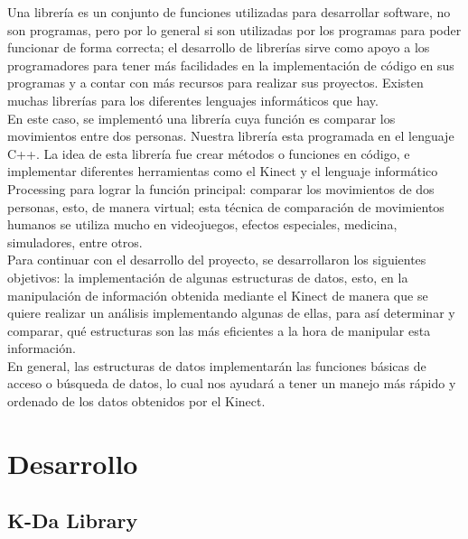 \documentclass[letterpaper]{article}
\begin{document}
Una librería es un conjunto de funciones utilizadas para desarrollar software, no son programas, pero por lo general si son utilizadas por los programas 
para poder funcionar de forma correcta; el desarrollo de librerías sirve como apoyo a los programadores para tener más facilidades en la implementación de código
en sus programas y a contar con más recursos para realizar sus proyectos. Existen muchas librerías para los diferentes lenguajes informáticos que hay.\\

En este caso, se implementó una librería cuya función es comparar los movimientos entre dos personas. Nuestra librería esta programada
en el lenguaje C++. La idea de esta librería fue crear métodos o funciones en código, e implementar diferentes herramientas como el Kinect y el lenguaje informático Processing para
lograr la función principal: comparar los movimientos de dos personas, esto, de manera virtual; esta técnica de comparación de movimientos humanos se utiliza mucho 
en videojuegos, efectos especiales, medicina, simuladores, entre otros.\\

Para continuar con el desarrollo del proyecto, se desarrollaron los siguientes objetivos: la implementación de algunas estructuras de datos, esto, en la manipulación de información obtenida mediante el Kinect de manera que se quiere realizar un análisis implementando algunas de ellas, para así determinar y comparar, qué estructuras son las más eficientes a la hora de manipular esta información.\\

En general, las estructuras de datos implementarán las funciones básicas de acceso o búsqueda de datos, lo cual nos ayudará a tener un manejo más rápido y ordenado de los datos obtenidos por el Kinect.

\section{Desarrollo}

\subsection{K-Da Library}
\end{document}
